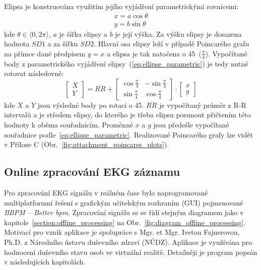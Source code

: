 \noindent Elipsa je konstruována využitím jejího vyjádření parametrickými
rovnicemi:
\begin{gather}
    \label{eq:ellipse_parametric}
    x = a \cos \theta \nonumber \\
    y = b \sin \theta
\end{gather}
kde $\theta \in \langle 0, 2\pi \rangle$, $a$ je šířka elipsy a $b$ je její
výška. Za výšku elipsy je dosazena hodnota $SD1$ a za šířku $SD2$. Hlavní osa
elipsy leží v případě Poincarého grafu na přímce dané předpisem $y=x$ a elipsa
je tak natočena o 45\degree~($\frac{\pi}{4}$). Vypočítané body z parametrického
vyjádření elipsy~(\ref{eq:ellipse_parametric}) je tedy nutné
rotovat následovně:
\begin{equation}
    \begin{bmatrix}
        X \\
        Y
    \end{bmatrix}
    =
    \overline{RR} +
    \begin{bmatrix}
        \cos \frac{\pi}{4} & -\sin \frac{\pi}{4} \\
        \sin \frac{\pi}{4} & \cos \frac{\pi}{4}
    \end{bmatrix}
    \cdot
    \begin{bmatrix}
        x \\
        y
    \end{bmatrix}
\end{equation}
kde $X$ a $Y$ jsou výsledné body po rotaci o 45\degree. $\overline{RR}$ je
vypočítaný průměr z R-R intervalů a je středem elipsy, do kterého je třeba
elipsu posunout přičtením této hodnoty k oběma souřadnicím. Proměnné $x$ a $y$
jsou předešle vypočítané souřadnice podle~\ref{eq:ellipse_parametric}. 
Realizované Poincarého grafy lze vidět v Příloze C (Obr.~\ref{fig:attachment_poincares_plots}).

\subsection{Online zpracování EKG záznamu}
\label{section:online_processing}
Pro zpracování EKG signálu v reálném čase bylo naprogramované multiplatformní
řešení s grafickým učitelským rozhraním (GUI) pojmenované \textit{BBPM -- Better
    bpm}. Zpracování signálu se se řídí stejným diagramem jako v
kapitole~\ref{section:offline_processing} na
Obr.~\ref{fig:diagram_offline_processing}. Motivací pro vznik aplikace je
spolupráce s Mgr. et Mgr. Ivetou Fajnerovou, Ph.D. z Národního ústavu duševního
zdraví (NÚDZ). Aplikace je využívána pro hodnocení duševního stavu osob ve
virtuální realitě. Detailněji je program popsán v následujících kapitolách.

